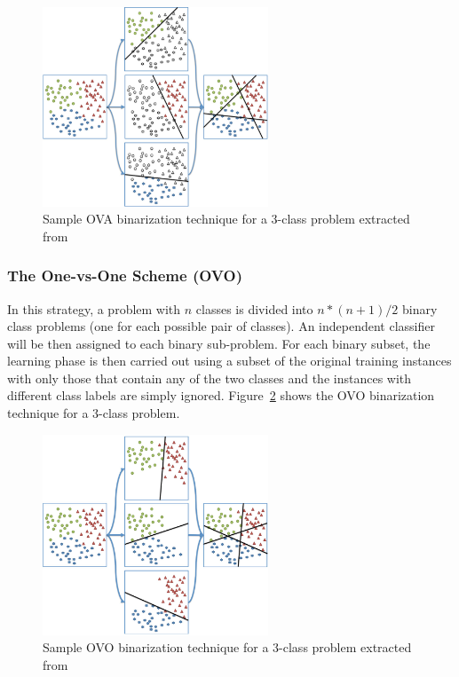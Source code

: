 \begin{figure}[ht]
    \centering
    \includegraphics[width=0.60\textwidth]{figures/11ova.png}
    \caption{Sample OVA binarization technique for a 3-class problem 
    extracted from~\cite{fernandez_learning_2018}}
    \label{fig:ova}
\end{figure}

\subsubsection{The One-vs-One Scheme (OVO)}
In this strategy, a problem with $n$ classes is divided into $n*(n+1)/2$  binary class 
problems (one for each possible pair of classes). An independent classifier will be then 
assigned to each binary sub-problem. For each binary subset, the learning phase is then 
carried out using a subset of the original training instances with only those that contain 
any of the two classes and the instances with different class labels are simply ignored. 
Figure~\ref{fig:ovo} shows the OVO binarization technique for a 3-class problem.

\begin{figure}[ht]
    \centering
    \includegraphics[width=0.60\textwidth]{figures/12ovo.png}
    \caption{Sample OVO binarization technique for a 3-class problem 
    extracted from~\cite{fernandez_learning_2018}}
    \label{fig:ovo}
\end{figure}

